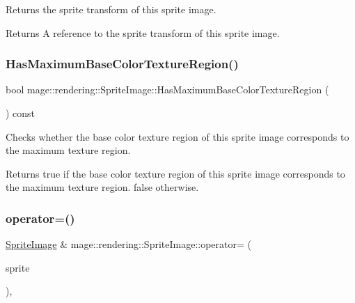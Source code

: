 Returns the sprite transform of this sprite image.

\begin{DoxyReturn}{Returns}
A reference to the sprite transform of this sprite image. 
\end{DoxyReturn}
\hypertarget{classmage_1_1rendering_1_1_sprite_image_a89e9dd78d50c2c312e06686bcc7347c1}{}\label{classmage_1_1rendering_1_1_sprite_image_a89e9dd78d50c2c312e06686bcc7347c1} 
\subsubsection{\texorpdfstring{Has\+Maximum\+Base\+Color\+Texture\+Region()}{HasMaximumBaseColorTextureRegion()}}
{\footnotesize\ttfamily bool mage\+::rendering\+::\+Sprite\+Image\+::\+Has\+Maximum\+Base\+Color\+Texture\+Region (\begin{DoxyParamCaption}{ }\end{DoxyParamCaption}) const\hspace{0.3cm}{\ttfamily [noexcept]}}

Checks whether the base color texture region of this sprite image corresponds to the maximum texture region.

\begin{DoxyReturn}{Returns}
{\ttfamily true} if the base color texture region of this sprite image corresponds to the maximum texture region. {\ttfamily false} otherwise. 
\end{DoxyReturn}
\hypertarget{classmage_1_1rendering_1_1_sprite_image_acf6e19eaf380ea76e4361778693facf2}{}\label{classmage_1_1rendering_1_1_sprite_image_acf6e19eaf380ea76e4361778693facf2} 
\subsubsection{\texorpdfstring{operator=()}{operator=()}\hspace{0.1cm}{\footnotesize\ttfamily [1/2]}}
{\footnotesize\ttfamily \hyperlink{classmage_1_1rendering_1_1_sprite_image}{Sprite\+Image} \& mage\+::rendering\+::\+Sprite\+Image\+::operator= (\begin{DoxyParamCaption}\item[{const \hyperlink{classmage_1_1rendering_1_1_sprite_image}{Sprite\+Image} \&}]{sprite }\end{DoxyParamCaption})\hspace{0.3cm}{\ttfamily [default]}, {\ttfamily [noexcept]}}

